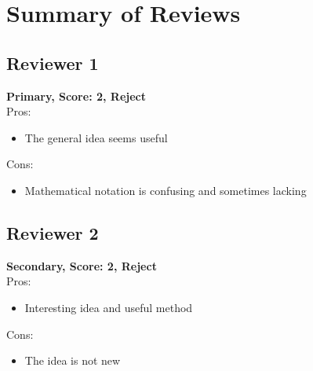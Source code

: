 \section{Summary of Reviews} \label{sec:reviewSummary}


\subsection{Reviewer 1}
\textbf{Primary, Score: 2, Reject} \\

Pros:
\begin{itemize}[itemsep=1pt,parsep=1pt]
    \item The general idea seems useful
\end{itemize}


Cons: 
\begin{itemize}[itemsep=1pt,parsep=1pt]
    \item Mathematical notation is confusing and sometimes lacking
\end{itemize}


\subsection{Reviewer 2}
\textbf{Secondary, Score: 2, Reject} \\

Pros: 
\begin{itemize}[itemsep=1pt,parsep=1pt]
    \item Interesting idea and useful method
\end{itemize}

Cons:
\begin{itemize}[itemsep=1pt,parsep=1pt]
    \item The idea is not new 
\end{itemize}


